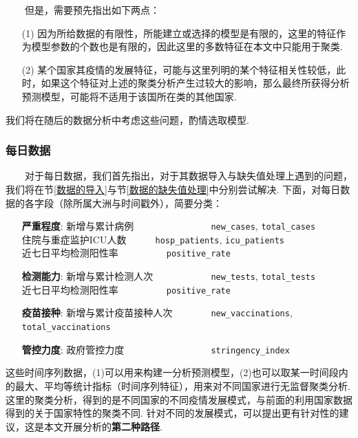 \documentclass[a4paper, titlepage]{article}
\begin{document}
        　　但是，需要预先指出如下两点：
        \begin{enumerate}[itemsep=-2pt,topsep=1pt]
            \item [(1)] 因为所给数据的有限性，所能建立或选择的模型是有限的，这里的特征作为模型参数的个数也是有限的，因此这里的多数特征在本文中只能用于聚类.
            \item [(2)] 某个国家其疫情的发展特征，可能与这里列明的某个特征相关性较低，此时，如果这个特征对上述的聚类分析产生过较大的影响，那么最终所获得分析预测模型，可能将不适用于该国所在类的其他国家.
        \end{enumerate}
        我们将在随后的数据分析中考虑这些问题，酌情选取模型.

        \subsubsection*{每日数据}
        　　对于每日数据，我们首先指出，对于其数据导入与缺失值处理上遇到的问题，我们将在节\ref{数据的导入}与节\ref{数据的缺失值处理}中分别尝试解决. 下面，对每日数据的各字段（除所属大洲与时间戳外），简要分类：
        \vspace{5pt}
        \begin{adjustwidth}{1cm}{0cm}
        {\kaishu
        \begin{itemize}[itemsep=-1pt,topsep=1pt]
            \item [\textbf{严重程度}:] 
                新增与累计病例　　　　　　　　\texttt{new\_cases}, \texttt{total\_cases}\\
                住院与重症监护ICU人数　　　\hspace{1em}\texttt{hosp\_patients}, \texttt{icu\_patients}\\
                近七日平均检测阳性率　　　　　\texttt{positive\_rate}
            \item [\textbf{检测能力}:]
                新增与累计检测人次　　　　　　\texttt{new\_tests}, \texttt{total\_tests}\\
                近七日平均检测阳性率　　　　　\texttt{positive\_rate}
            \item [\textbf{疫苗接种}:] 
                新增与累计疫苗接种人次　　　　\texttt{new\_vaccinations}, \texttt{total\_vaccinations}
            \item [\textbf{管控力度}:] 
                政府管控力度　　　　　　　　　\texttt{stringency\_index}
        \end{itemize}
        }
        \end{adjustwidth}
        \vspace{5pt}
        这些时间序列数据，(1)可以用来构建一分析预测模型，(2)也可以取某一时间段内的最大、平均等统计指标（时间序列特征），用来对不同国家进行无监督聚类分析. 这里的聚类分析，得到的是不同国家的不同疫情发展模式，与前面的利用国家数据得到的关于国家特性的聚类不同. 针对不同的发展模式，可以提出更有针对性的建议，这是本文开展分析的\textbf{第二种路径}.
\end{document}
